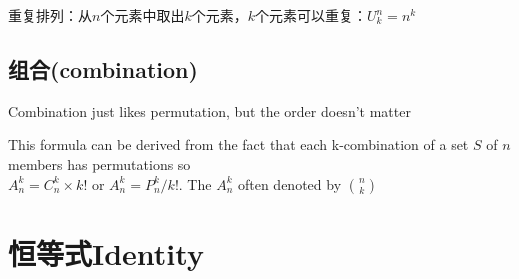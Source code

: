 \documentclass[../main.tex]{subfiles}
\begin{document}
重复排列：从$n$个元素中取出$k$个元素，$k$个元素可以重复：$U^{n}_{k}=n^{k}$

\subsection{组合(combination)}
Combination just likes permutation, but the order doesn't matter

This formula can be derived from the fact that each k-combination of a set $S$ of $n$ members has permutations so\\
$A_{n}^{k}=C_{n}^{k}\times k!$ or $A_{n}^{k}=P_{n}^{k}/k!$. The $A_{n}^{k}$ often denoted by $\binom{n}{k}$

\newpage
\section{恒等式Identity}
\vspace{-1em}
\end{document}
